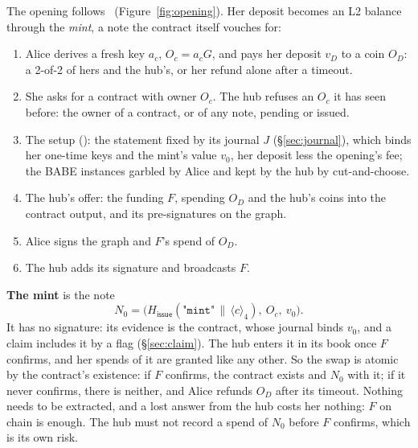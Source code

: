 \documentclass[11pt]{article}
\theoremstyle{plain}
\theoremstyle{definition}
\newcommand{\be}[2]{\langle #1\rangle_{#2}}
\newcommand{\Ht}[1]{H_{\textsf{#1}}}
\newcommand{\Oc}{O_c}
\begin{document}
The opening follows~\cite{lichen} (Figure~\ref{fig:opening}). Her
deposit becomes an L2 balance through the \emph{mint}, a note the
contract itself vouches for:
\begin{enumerate}[nosep]
\item Alice derives a fresh key $a_c$, $\Oc = a_cG$, and pays her
  deposit $v_D$ to a coin $O_D$: a 2-of-2 of hers and the hub's, or her
  refund alone after a timeout.
\item She asks for a contract with owner $\Oc$. The hub refuses an $\Oc$
  it has seen before: the owner of a contract, or of any note, pending
  or issued.
\item The setup (\cite{lichen}): the statement fixed by its journal $J$
  (\S\ref{sec:journal}), which binds her one-time keys and the mint's
  value $v_0$, her deposit less the opening's fee; the BABE instances
  garbled by Alice and kept by the hub by cut-and-choose.
\item The hub's offer: the funding $F$, spending $O_D$ and the hub's
  coins into the contract output, and its pre-signatures on the graph.
\item Alice signs the graph and $F$'s spend of $O_D$.
\item The hub adds its signature and broadcasts $F$.
\end{enumerate}
\textbf{The mint} is the note
\[
  N_0 = \big(\Ht{issue}(\texttt{"mint"} \,\|\, \be{c}{4}),\ \Oc,\ v_0\big).
\]
It has no signature: its evidence is the contract, whose journal binds
$v_0$, and a claim includes it by a flag (\S\ref{sec:claim}). The hub
enters it in its book once $F$ confirms, and her spends of it are
granted like any other. So the swap is atomic by the contract's
existence: if $F$ confirms, the contract exists and $N_0$ with it; if
it never confirms, there is neither, and Alice refunds $O_D$ after its
timeout. Nothing needs to be extracted, and a lost answer from the hub
costs her nothing: $F$ on chain is enough. The hub must not record a
spend of $N_0$ before $F$ confirms, which is its own risk.
\end{document}
